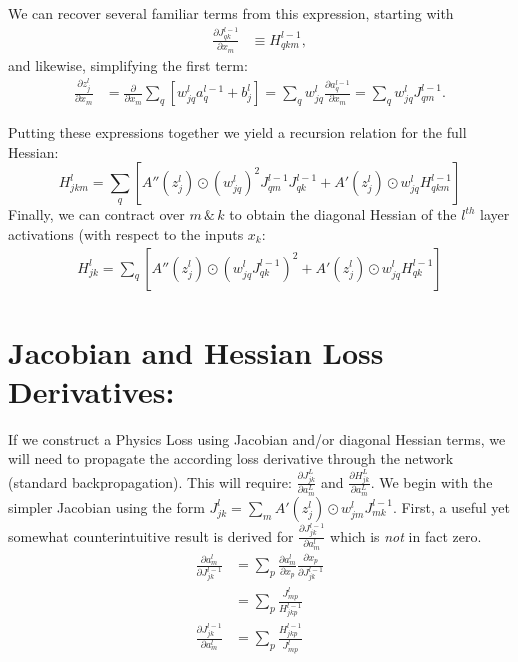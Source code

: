 \documentclass{article}
\begin{document}
We can recover several familiar terms from this expression, starting with
\begin{align}
\frac{\partial J_{qk}^{l-1}}{\partial x_m} &\equiv H_{qkm}^{l-1},
\end{align}
\indent and likewise, simplifying the first term:
\begin{align}
\frac{\partial z_j^l}{\partial x_m} 
&= \frac{\partial}{\partial x_m} \sum_q \left[ w_{jq}^l a_q^{l-1} + b_j^l \right]
= \sum_q w_{jq}^l \frac{\partial a_q^{l-1}}{\partial x_m}
= \sum_q w_{jq}^l J_{qm}^{l-1}.
\end{align}

Putting these expressions together we yield a recursion relation for the full Hessian:
\begin{equation}
H_{jkm}^l = \sum_q \left[ A''(z_j^l) \odot (w_{jq}^l)^2 J_{qm}^{l-1} J_{qk}^{l-1} + A'(z_j^l) \odot w_{jq}^l H_{qkm}^{l-1} \right]
\end{equation}
Finally, we can contract over \(m \, \text{\&} \, k \) to obtain the diagonal Hessian of the \(l^{th}\) layer activations (with respect to the inputs \(x_k\):
\begin{align}
H_{jk}^l = \sum_q \left[ A''(z_j^l) \odot ( w_{jq}^l J_{qk}^{l-1} )^2 + A'(z_j^l) \odot w_{jq}^l H_{qk}^{l-1} \right] 
\end{align}


\section*{Jacobian and Hessian Loss Derivatives:}
If we construct a Physics Loss using Jacobian and/or diagonal Hessian terms, we will need to propagate the according loss derivative through the network (standard backpropagation). This will require: \(\frac{\partial J_{jk}^L}{\partial a_m^L}\) and \(\frac{\partial H_{jk}^L}{\partial a_m^L}\). We begin with the simpler Jacobian using the form \(J_{jk}^l = \sum_m A'(z_j^l) \odot w_{jm}^l J_{mk}^{l-1}\). First, a useful yet somewhat counterintuitive result is derived for \(\frac{\partial J_{jk}^{l-1}}{\partial a_m^l} \) which is \textit{not} in fact zero.
\begin{align}
\frac{\partial a_m^l}{\partial J_{jk}^{l-1}} &= \sum_p \frac{\partial a_m^l}{\partial x_p} \frac{\partial x_p}{\partial J_{jk}^{l-1}} \\
&= \sum_p \frac{J_{mp}^l}{H_{jkp}^{l-1}} \\
\frac{\partial J_{jk}^{l-1}}{\partial a_m^l} &= \sum_p \frac{H_{jkp}^{l-1}}{J_{mp}^l}
\end{align}
\end{document}
